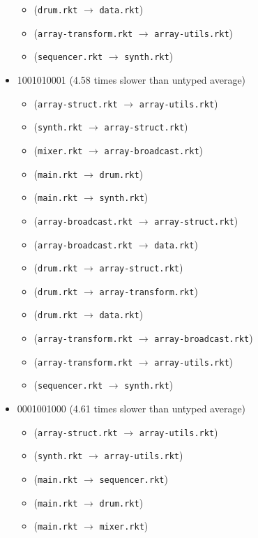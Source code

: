 \documentclass{article}
\newcommand{\mono}[1]{\texttt{#1}}
\begin{document}
\begin{itemize}
\begin{itemize}
  \item (\mono{drum.rkt} $\rightarrow$ \mono{data.rkt})
  \item (\mono{array-transform.rkt} $\rightarrow$ \mono{array-utils.rkt})
  \item (\mono{sequencer.rkt} $\rightarrow$ \mono{synth.rkt})
  \end{itemize}
\item 1001010001 (4.58 times slower than untyped average)
  \begin{itemize}
  \item (\mono{array-struct.rkt} $\rightarrow$ \mono{array-utils.rkt})
  \item (\mono{synth.rkt} $\rightarrow$ \mono{array-struct.rkt})
  \item (\mono{mixer.rkt} $\rightarrow$ \mono{array-broadcast.rkt})
  \item (\mono{main.rkt} $\rightarrow$ \mono{drum.rkt})
  \item (\mono{main.rkt} $\rightarrow$ \mono{synth.rkt})
  \item (\mono{array-broadcast.rkt} $\rightarrow$ \mono{array-struct.rkt})
  \item (\mono{array-broadcast.rkt} $\rightarrow$ \mono{data.rkt})
  \item (\mono{drum.rkt} $\rightarrow$ \mono{array-struct.rkt})
  \item (\mono{drum.rkt} $\rightarrow$ \mono{array-transform.rkt})
  \item (\mono{drum.rkt} $\rightarrow$ \mono{data.rkt})
  \item (\mono{array-transform.rkt} $\rightarrow$ \mono{array-broadcast.rkt})
  \item (\mono{array-transform.rkt} $\rightarrow$ \mono{array-utils.rkt})
  \item (\mono{sequencer.rkt} $\rightarrow$ \mono{synth.rkt})
  \end{itemize}
\item 0001001000 (4.61 times slower than untyped average)
  \begin{itemize}
  \item (\mono{array-struct.rkt} $\rightarrow$ \mono{array-utils.rkt})
  \item (\mono{synth.rkt} $\rightarrow$ \mono{array-utils.rkt})
  \item (\mono{main.rkt} $\rightarrow$ \mono{sequencer.rkt})
  \item (\mono{main.rkt} $\rightarrow$ \mono{drum.rkt})
  \item (\mono{main.rkt} $\rightarrow$ \mono{mixer.rkt})

\end{itemize}
\end{itemize}
\end{document}
